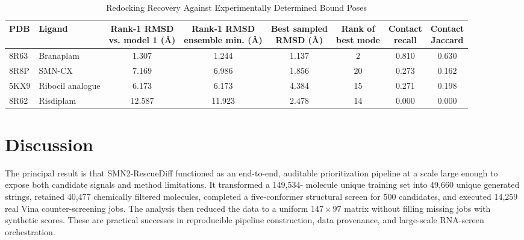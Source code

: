 \documentclass[journal]{IEEEtran}
\begin{document}
\begin{table}[!t]
\caption{Redocking Recovery Against Experimentally Determined Bound Poses}
\label{tab:redock}
\centering
\footnotesize
\setlength{\tabcolsep}{4.5pt}
\renewcommand{\arraystretch}{1.25}
\begin{tabular}{@{}llcccccc@{}}
\toprule
\textbf{PDB} & \textbf{Ligand} &
\makecell{\textbf{Rank-1 RMSD}\\\textbf{vs. model 1 (\AA)}} &
\makecell{\textbf{Rank-1 RMSD}\\\textbf{ensemble min. (\AA)}} &
\makecell{\textbf{Best sampled}\\\textbf{RMSD (\AA)}} &
\makecell{\textbf{Rank of}\\\textbf{best mode}} &
\makecell{\textbf{Contact}\\\textbf{recall}} &
\makecell{\textbf{Contact}\\\textbf{Jaccard}}\\
\midrule
8R63 & Branaplam              & 1.307  & 1.244  & 1.137 & 2  & 0.810 & 0.630\\
8R8P & SMN-CX                 & 7.169  & 6.986  & 1.856 & 20 & 0.273 & 0.162\\
5KX9 & Ribocil analogue       & 6.173  & 6.173  & 4.384 & 15 & 0.271 & 0.198\\
8R62 & Risdiplam              & 12.587 & 11.923 & 2.478 & 14 & 0.000 & 0.000\\
\bottomrule
\end{tabular}
\end{table}


\section{Discussion}
The principal result is that SMN2-RescueDiff functioned as an end-to-end,
auditable prioritization pipeline at a scale large enough to expose both
candidate signals and method limitations. It transformed a 149{,}534-
molecule unique training set into 49{,}660 unique generated strings,
retained 40{,}477 chemically filtered molecules, completed a
five-conformer structural screen for 500 candidates, and executed
14{,}259 real Vina counter-screening jobs. The analysis then reduced the
data to a uniform $147\times97$ matrix without filling missing jobs with
synthetic scores. These are practical successes in reproducible pipeline
construction, data provenance, and large-scale RNA-screen orchestration.
\end{document}
